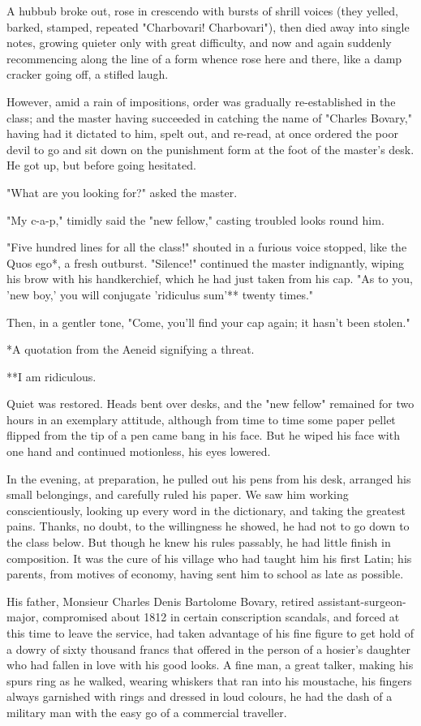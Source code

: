 \documentclass[11pt,twocolumn]{ltugboat}
\begin{document}
A hubbub broke out, rose in crescendo with bursts of shrill voices (they
yelled, barked, stamped, repeated "Charbovari! Charbovari"), then died
away into single notes, growing quieter only with great difficulty, and
now and again suddenly recommencing along the line of a form whence rose
here and there, like a damp cracker going off, a stifled laugh.

However, amid a rain of impositions, order was gradually re-established
in the class; and the master having succeeded in catching the name of
"Charles Bovary," having had it dictated to him, spelt out, and re-read,
at once ordered the poor devil to go and sit down on the punishment form
at the foot of the master's desk. He got up, but before going hesitated.

"What are you looking for?" asked the master.

"My c-a-p," timidly said the "new fellow," casting troubled looks round
him.

"Five hundred lines for all the class!" shouted in a furious voice
stopped, like the Quos ego*, a fresh outburst. "Silence!" continued the
master indignantly, wiping his brow with his handkerchief, which he
had just taken from his cap. "As to you, 'new boy,' you will conjugate
'ridiculus sum'** twenty times."

Then, in a gentler tone, "Come, you'll find your cap again; it hasn't
been stolen."

     *A quotation from the Aeneid signifying a threat.

     **I am ridiculous.

Quiet was restored. Heads bent over desks, and the "new fellow" remained
for two hours in an exemplary attitude, although from time to time some
paper pellet flipped from the tip of a pen came bang in his face. But he
wiped his face with one hand and continued motionless, his eyes lowered.

In the evening, at preparation, he pulled out his pens from his desk,
arranged his small belongings, and carefully ruled his paper. We saw him
working conscientiously, looking up every word in the dictionary, and
taking the greatest pains. Thanks, no doubt, to the willingness he
showed, he had not to go down to the class below. But though he knew his
rules passably, he had little finish in composition. It was the cure
of his village who had taught him his first Latin; his parents, from
motives of economy, having sent him to school as late as possible.

His father, Monsieur Charles Denis Bartolome Bovary, retired
assistant-surgeon-major, compromised about 1812 in certain conscription
scandals, and forced at this time to leave the service, had taken
advantage of his fine figure to get hold of a dowry of sixty thousand
francs that offered in the person of a hosier's daughter who had fallen
in love with his good looks. A fine man, a great talker, making his
spurs ring as he walked, wearing whiskers that ran into his moustache,
his fingers always garnished with rings and dressed in loud colours,
he had the dash of a military man with the easy go of a commercial
traveller.
\end{document}
